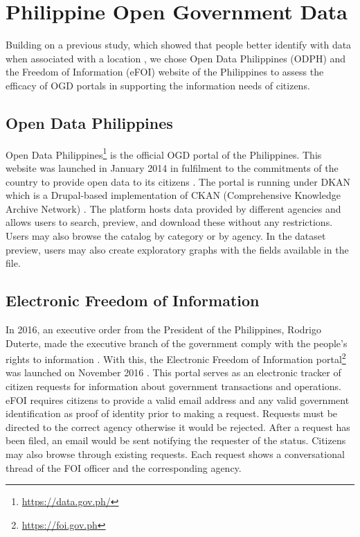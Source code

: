 \documentclass{sigchi}
\begin{document}
\section{Philippine Open Government Data}
Building on a previous study, which showed that people better identify with data when associated with a location \cite{Puussaar2018}, we chose Open Data Philippines (ODPH) and the Freedom of Information (eFOI) website of the Philippines to assess the efficacy of OGD portals in supporting the information needs of citizens. 

\subsection{Open Data Philippines}
Open Data Philippines\footnote{\url{https://data.gov.ph/}} is the official OGD portal of the Philippines. This website was launched in January 2014 in fulfilment to the commitments of the country to provide open data to its citizens \cite{ODPH2015}. The portal is running under DKAN which is a Drupal-based implementation of CKAN (Comprehensive Knowledge Archive Network) \cite{dkan2019}. The platform hosts data provided by different agencies and allows users to search, preview, and download these without any restrictions. Users may also browse the catalog by category or by agency. In the dataset preview, users may also create exploratory graphs with the fields available in the file.


\subsection{Electronic Freedom of Information}
In 2016, an executive order from the President of the Philippines, Rodrigo Duterte, made the executive branch of the government comply with the people's rights to information \cite{duterte2016}. With this, the Electronic Freedom of Information portal\footnote{\url{https://foi.gov.ph}} was launched on November 2016 \cite{cigaral2016}. This portal serves as an electronic tracker of citizen requests for information about government transactions and operations. eFOI requires citizens to provide a valid email address and any valid government identification as proof of identity prior to making a request. Requests must be directed to the correct agency otherwise it would be rejected. After a request has been filed, an email would be sent notifying the requester of the status. Citizens may also browse through existing requests. Each request shows a conversational thread of the FOI officer and the corresponding agency. 
\end{document}

